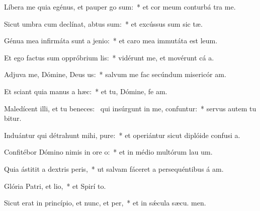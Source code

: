 \item Líbera me quia egénus, et pauper go sum:~* et cor meum conturbá  tra me.
\item Sicut umbra cum declínat, abtus sum:~* et excússus sum sic tæ.
\item Génua mea infirmáta sunt a jenio:~* et caro mea immutáta est  leum.
\item Et ego factus sum oppróbrium lis:~* vidérunt me, et movérunt cá a.
\item Adjuva me, Dómine, Deus us:~* salvum me fac secúndum misericór am.
\item Et sciant quia manus a hæc:~* et tu, Dómine, fe am.
\item Maledícent illi, et tu beneces:~\pscross{} qui insúrgunt in me, confuntur:~* servus autem tu bitur.
\item Induántur qui détrahunt mihi, pure:~* et operiántur sicut diplóide confusi a.
\item Confitébor Dómino nimis in ore o:~* et in médio multórum lau um.
\item Quia ástitit a dextris peris,~* ut salvam fáceret a persequéntibus á am.
\item Glória Patri, et lio,~* et Spirí to.
\item Sicut erat in princípio, et nunc, et per,~* et in sǽcula sæcu. men.
